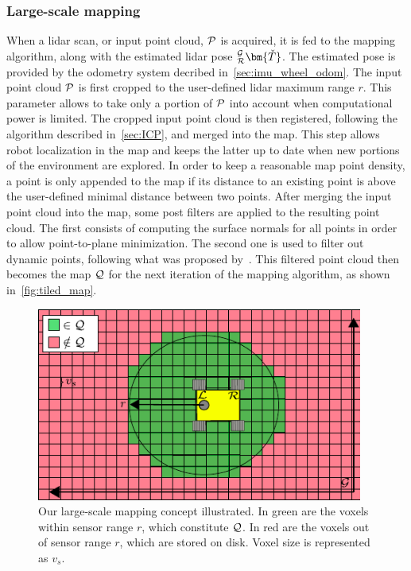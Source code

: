 \subsubsection{Large-scale mapping}
\label{sec:tiled_map}

When a lidar scan, or input point cloud, $\mathcal{P}$ is acquired, it is fed to the mapping algorithm, along with the estimated lidar pose $_{\robotf}^{\mapf}\bm{\check{T}}$.
The estimated pose is provided by the odometry system decribed in~\autoref{sec:imu_wheel_odom}.
The input point cloud  $\mathcal{P}$ is first cropped to the user-defined lidar maximum range $r$.
This parameter allows to take only a portion of $\mathcal{P}$ into account when computational power is limited.
The cropped input point cloud is then registered, following the algorithm described in~\autoref{sec:ICP}, and merged into the map.
This step allows robot localization in the map and keeps the latter up to date when new portions of the environment are explored.
In order to keep a reasonable map point density, a point is only appended to the map if its distance to an existing point is above the user-defined minimal distance between two points.
After merging the input point cloud into the map, some post filters are applied to the resulting point cloud.
The first consists of computing the surface normals for all points in order to allow point-to-plane minimization.
The second one is used to filter out dynamic points, following what was proposed by~\citet{Pomerleau2014}.
This filtered point cloud then becomes the map $\mathcal{Q}$ for the next iteration of the mapping algorithm, as shown in~\autoref{fig:tiled_map}.

\begin{figure}
	\centering
	\includegraphics[height=2.5in]{figs/tiled_mapping/tiled_mapping.pdf}
	\caption{Our large-scale mapping concept illustrated.
	In green are the voxels within sensor range $r$, which constitute $\mathcal{Q}$.
	In red are the voxels out of sensor range $r$, which are stored on disk.
	Voxel size is represented as $v_s$.}
	\label{fig:tiled_map}
\end{figure}

